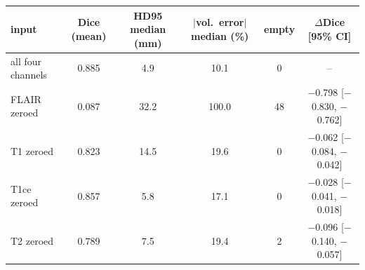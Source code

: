 \begin{tabular}{lccccc}
\toprule
input & Dice (mean) & HD95 median (mm) & $|$vol.\ error$|$ median (\%) & empty & $\Delta$Dice [95\% CI] \\
\midrule
all four channels & 0.885 & 4.9 & 10.1 & 0 & -- \\
FLAIR zeroed & 0.087 & 32.2 & 100.0 & 48 & $-$0.798 [$-$0.830, $-$0.762] \\
T1 zeroed & 0.823 & 14.5 & 19.6 & 0 & $-$0.062 [$-$0.084, $-$0.042] \\
T1ce zeroed & 0.857 & 5.8 & 17.1 & 0 & $-$0.028 [$-$0.041, $-$0.018] \\
T2 zeroed & 0.789 & 7.5 & 19.4 & 2 & $-$0.096 [$-$0.140, $-$0.057] \\
\bottomrule
\end{tabular}